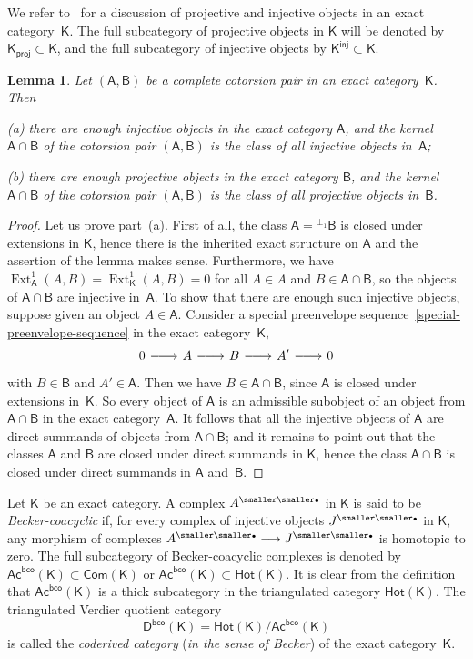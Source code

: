 \documentclass[12pt,a4paper]{amsart}
\newcommand{\+}{\nobreakdash-}
\renewcommand{\:}{\colon}
\newcommand{\rarrow}{\longrightarrow}
\newcommand{\bu}{{\text{\smaller\smaller$\scriptstyle\bullet$}}}
\newcommand{\lrarrow}{\mskip.5\thinmuskip\relbar\joinrel\relbar\joinrel
 \rightarrow\mskip.5\thinmuskip\relax}
\DeclareMathOperator{\Ext}{Ext}
\newcommand{\sA}{\mathsf A}
\newcommand{\sB}{\mathsf B}
\newcommand{\sD}{\mathsf D}
\newcommand{\sK}{\mathsf K}
\newcommand{\Hot}{\mathsf{Hot}}
\newcommand{\Com}{\mathsf{Com}}
\newcommand{\Ac}{\mathsf{Ac}}
\newcommand{\proj}{\mathsf{proj}}
\newcommand{\inj}{\mathsf{inj}}
\newcommand{\bco}{\mathsf{bco}}
\theoremstyle{plain}
\newtheorem{lem}[thm]{Lemma}
\theoremstyle{definition}
\begin{document}
 We refer to~\cite[Section~11]{Bueh} for a discussion of projective
and injective objects in an exact category~$\sK$.
 The full subcategory of projective objects in $\sK$ will be denoted
by $\sK_\proj\subset\sK$, and the full subcategory of injective
objects by $\sK^\inj\subset\sK$.

\begin{lem} \label{inj-proj-objects-in-left-right-classes}
 Let $(\sA,\sB)$ be a complete cotorsion pair in an exact
category~$\sK$.
 Then \par
\textup{(a)} there are enough injective objects in the exact category\/
$\sA$, and the kernel\/ $\sA\cap\sB$ of the cotorsion pair $(\sA,\sB)$
is the class of all injective objects in\/~$\sA$; \par
\textup{(b)} there are enough projective objects in the exact category\/
$\sB$, and the kernel\/ $\sA\cap\sB$ of the cotorsion pair $(\sA,\sB)$
is the class of all projective objects in\/~$\sB$.
\end{lem}

\begin{proof}
 Let us prove part~(a).
 First of all, the class $\sA={}^{\perp_1}\sB$ is closed under
extensions in $\sK$, hence there is the inherited exact structure
on $\sA$ and the assertion of the lemma makes sense.
 Furthermore, we have $\Ext^1_\sA(A,B)=\Ext^1_\sK(A,B)=0$ for all
$A\in A$ and $B\in\sA\cap\sB$, so the objects of $\sA\cap\sB$ are
injective in~$\sA$.
 To show that there are enough such injective objects, suppose given
an object $A\in\sA$.
 Consider a special preenvelope
sequence~\eqref{special-preenvelope-sequence} in the exact
category~$\sK$,
$$
 0\lrarrow A\lrarrow B\lrarrow A'\lrarrow0
$$
with $B\in\sB$ and $A'\in\sA$.
 Then we have $B\in\sA\cap\sB$, since $\sA$ is closed under extensions
in~$\sK$.
 So every object of $\sA$ is an admissible subobject of an object from
$\sA\cap\sB$ in the exact category~$\sA$.
 It follows that all the injective objects of $\sA$ are direct summands
of objects from $\sA\cap\sB$; and it remains to point out that
the classes $\sA$ and $\sB$ are closed under direct summands in $\sK$,
hence the class $\sA\cap\sB$ is closed under direct summands in $\sA$
and~$\sB$.
\end{proof}

 Let $\sK$ be an exact category.
 A complex $A^\bu$ in $\sK$ is said to be \emph{Becker-coacyclic}
if, for every complex of injective objects $J^\bu$ in $\sK$, any
morphism of complexes $A^\bu\rarrow J^\bu$ is homotopic to zero.
 The full subcategory of Becker-coacyclic complexes is denoted by
$\Ac^\bco(\sK)\subset\Com(\sK)$ or $\Ac^\bco(\sK)\subset\Hot(\sK)$.
 It is clear from the definition that $\Ac^\bco(\sK)$ is a thick
subcategory in the triangulated category $\Hot(\sK)$.
 The triangulated Verdier quotient category
$$
 \sD^\bco(\sK)=\Hot(\sK)/\Ac^\bco(\sK)
$$
is called the \emph{coderived category} (\emph{in the sense of Becker})
of the exact category~$\sK$.
\end{document}
